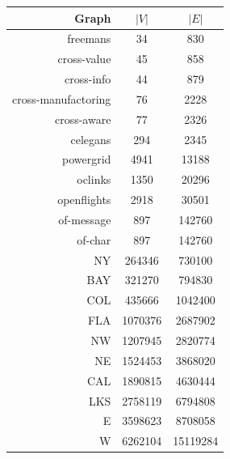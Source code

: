 \begin{tabular}{rcc}
\textbf{\textsf{Graph}} & $|V|$ & $|E|$ \\
\midrule
freemans & 34 & 830 \\
cross-value & 45 & 858 \\
cross-info & 44 & 879 \\
cross-manufactoring & 76 & 2228 \\
cross-aware & 77 & 2326 \\
celegans & 294 & 2345 \\
powergrid & 4941 & 13188 \\
oclinks & 1350 & 20296 \\
openflights & 2918 & 30501 \\
of-message & 897 & 142760 \\
of-char & 897 & 142760 \\
NY & 264346 & 730100 \\
BAY & 321270 & 794830 \\
COL & 435666 & 1042400 \\
FLA & 1070376 & 2687902 \\
NW & 1207945 & 2820774 \\
NE & 1524453 & 3868020 \\
CAL & 1890815 & 4630444 \\
LKS & 2758119 & 6794808 \\
E & 3598623 & 8708058 \\
W & 6262104 & 15119284 \\
\end{tabular}